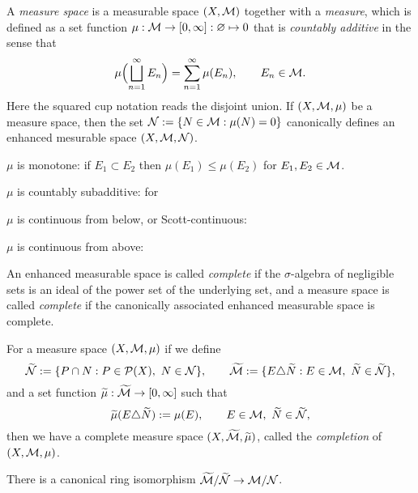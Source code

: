 \documentclass{../../large}
\begin{document}
\begin{prb}
A \emph{measure space} is a measurable space $(X,\mathcal{M})$ together with a \emph{measure}, which is defined as a set function $\mu:\mathcal{M}\to[0,\infty]:\varnothing\mapsto0$ that is \emph{countably additive} in the sense that
\[\mu\Bigl(\bigsqcup_{n=1}^\infty E_n\Bigr)=\sum_{n=1}^\infty\mu(E_n),\qquad E_n\in\mathcal{M}.\]
Here the squared cup notation reads the disjoint union.
If $(X,\mathcal{M},\mu)$ be a measure space, then the set $\mathcal{N}:=\{N\in\mathcal{M}:\mu(N)=0\}$ canonically defines an enhanced mesurable space $(X,\mathcal{M},\mathcal{N})$.
\begin{parts}
\item $\mu$ is monotone: if $E_1\subset E_2$ then $\mu(E_1)\le\mu(E_2)$ for $E_1,E_2\in\mathcal{M}$.
\item $\mu$ is countably subadditive: for
\item $\mu$ is continuous from below, or Scott-continuous:
\item $\mu$ is continuous from above:
\end{parts}
\end{prb}
\begin{pf}

\end{pf}


\begin{prb}
An enhanced measurable space is called \emph{complete} if the $\sigma$-algebra of negligible sets is an ideal of the power set of the underlying set, and a measure space is called \emph{complete} if the canonically associated enhanced measurable space is complete.

For a measure space $(X,\mathcal{M},\mu)$ if we define
\[\tilde\cN:=\{P\cap N:P\in\cP(X),\ N\in\cN\},\qquad\tilde\cM:=\{E\triangle\tilde N:E\in\cM,\ \tilde N\in\tilde\cN\},\]
and a set function $\widetilde\mu:\widetilde{\mathcal{M}}\to[0,\infty]$ such that
\[\widetilde\mu(E\triangle\widetilde N):=\mu(E),\qquad E\in\mathcal{M},\ \widetilde N\in\widetilde{\mathcal{N}},\]
then we have a complete measure space $(X,\widetilde{\mathcal{M}},\widetilde\mu)$, called the \emph{completion} of $(X,\mathcal{M},\mu)$.
\begin{parts}
\item There is a canonical ring isomorphism $\widetilde{\mathcal{M}}/\widetilde{\mathcal{N}}\to\mathcal{M}/\mathcal{N}$.
\end{parts}
\end{prb}
\end{document}
